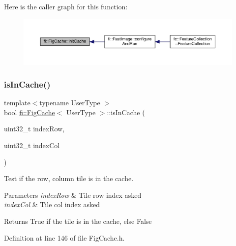 Here is the caller graph for this function\+:
\nopagebreak
\begin{figure}[H]
\begin{center}
\leavevmode
\includegraphics[width=350pt]{d7/d31/classfi_1_1FigCache_a7e9e6784d3b4415d180cd6b24f7e1afa_icgraph}
\end{center}
\end{figure}
\mbox{\label{classfi_1_1FigCache_a4d4792d8a1d737b5b6baa261c1761751}} 
\subsubsection{\texorpdfstring{is\+In\+Cache()}{isInCache()}}
{\footnotesize\ttfamily template$<$typename User\+Type $>$ \\
bool \hyperlink{classfi_1_1FigCache}{fi\+::\+Fig\+Cache}$<$ User\+Type $>$\+::is\+In\+Cache (\begin{DoxyParamCaption}\item[{uint32\+\_\+t}]{index\+Row,  }\item[{uint32\+\_\+t}]{index\+Col }\end{DoxyParamCaption})\hspace{0.3cm}{\ttfamily [inline]}}



Test if the row, column tile is in the cache. 


\begin{DoxyParams}{Parameters}
{\em index\+Row} & Tile row index asked \\
\hline
{\em index\+Col} & Tile col index asked \\
\hline
\end{DoxyParams}
\begin{DoxyReturn}{Returns}
True if the tile is in the cache, else False 
\end{DoxyReturn}


Definition at line 146 of file Fig\+Cache.\+h.

